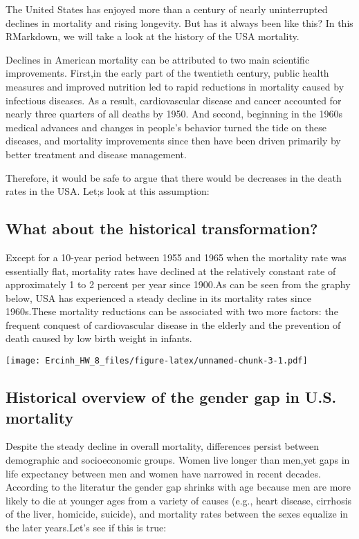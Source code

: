 \documentclass[]{article}
\begin{document}
The United States has enjoyed more than a century of nearly
uninterrupted declines in mortality and rising longevity. But has it
always been like this? In this RMarkdown, we will take a look at the
history of the USA mortality.

Declines in American mortality can be attributed to two main scientific
improvements. First,in the early part of the twentieth century, public
health measures and improved nutrition led to rapid reductions in
mortality caused by infectious diseases. As a result, cardiovascular
disease and cancer accounted for nearly three quarters of all deaths by
1950. And second, beginning in the 1960s medical advances and changes in
people's behavior turned the tide on these diseases, and mortality
improvements since then have been driven primarily by better treatment
and disease management.

Therefore, it would be safe to argue that there would be decreases in
the death rates in the USA. Let;s look at this assumption:

\hypertarget{what-about-the-historical-transformation}{%
\subsection{What about the historical
transformation?}\label{what-about-the-historical-transformation}}

Except for a 10-year period between 1955 and 1965 when the mortality
rate was essentially flat, mortality rates have declined at the
relatively constant rate of approximately 1 to 2 percent per year since
1900.As can be seen from the graphy below, USA has experienced a steady
decline in its mortality rates since 1960s.These mortality reductions
can be associated with two more factors: the frequent conquest of
cardiovascular disease in the elderly and the prevention of death caused
by low birth weight in infants.

\texttt{[image: Ercinh\_HW\_8\_files/figure-latex/unnamed-chunk-3-1.pdf]}

\hypertarget{historical-overview-of-the-gender-gap-in-u.s.-mortality}{%
\subsection{Historical overview of the gender gap in U.S.
mortality}\label{historical-overview-of-the-gender-gap-in-u.s.-mortality}}

Despite the steady decline in overall mortality, differences persist
between demographic and socioeconomic groups. Women live longer than
men,yet gaps in life expectancy between men and women have narrowed in
recent decades. According to the literatur the gender gap shrinks with
age because men are more likely to die at younger ages from a variety of
causes (e.g., heart disease, cirrhosis of the liver, homicide, suicide),
and mortality rates between the sexes equalize in the later years.Let's
see if this is true:
\end{document}
